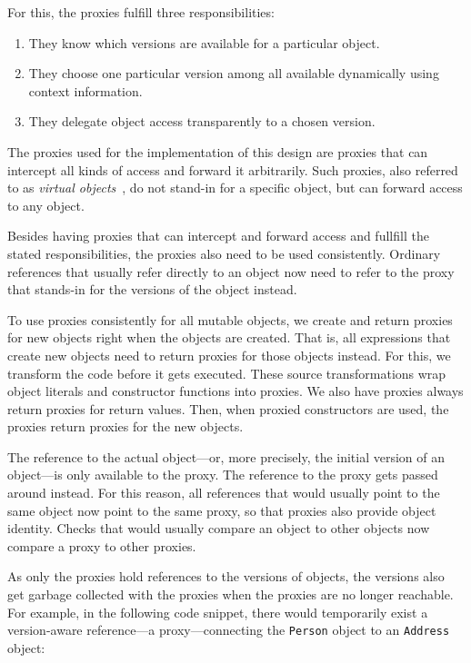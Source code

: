 For this, the proxies fulfill three responsibilities:
\begin{enumerate}
    \item They know which versions are available for a particular object.
    \item They choose one particular version among all available dynamically using context information.
    \item They delegate object access transparently to a chosen version.
\end{enumerate}

The proxies used for the implementation of this design are proxies that can intercept all kinds of access and forward it arbitrarily.
Such proxies, also referred to as \emph{virtual objects}~\cite{VanCutsem2010PDP}, do not stand-in for a specific object, but can forward access to any object.

Besides having proxies that can intercept and forward access and fullfill the stated responsibilities, the proxies also need to be used consistently.
Ordinary references that usually refer directly to an object now need to refer to the proxy that stands-in for the versions of the object instead.

To use proxies consistently for all mutable objects, we create and return proxies for new objects right when the objects are created.
That is, all expressions that create new objects need to return proxies for those objects instead.
For this, we transform the code before it gets executed.
These source transformations wrap object literals and constructor functions into proxies.
We also have proxies always return proxies for return values.
Then, when proxied constructors are used, the proxies return proxies for the new objects.

The reference to the actual object---or, more precisely, the initial version of an object---is only available to the proxy.
The reference to the proxy gets passed around instead.
For this reason, all references that would usually point to the same object now point to the same proxy, so that proxies also provide object identity.
Checks that would usually compare an object to other objects now compare a proxy to other proxies.

As only the proxies hold references to the versions of objects, the versions also get garbage collected with the proxies when the proxies are no longer reachable.
For example, in the following code snippet, there would temporarily exist a version-aware reference---a proxy---connecting the \lstinline{Person} object to an \lstinline{Address} object:

